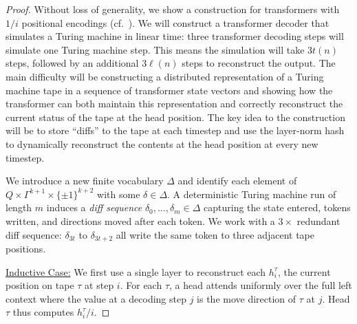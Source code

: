 \begin{proof}
    Without loss of generality, we show a construction for transformers with $1/i$ positional encodings (cf.~).
    We will construct a transformer decoder that simulates a Turing machine in linear time: three transformer decoding steps will simulate one Turing machine step. This means the simulation will take $3t(n)$ steps, followed by an additional $3\ell(n)$ steps to reconstruct the output. The main difficulty will be constructing a distributed representation of a Turing machine tape in a sequence of transformer state vectors and showing how the transformer can both maintain this representation and correctly reconstruct the current status of the tape at the head position. The key idea to the construction will be to store ``diffs'' to the tape at each timestep and use the layer-norm hash to dynamically reconstruct the contents at the head position at every new timestep.

    We introduce a new finite vocabulary $\Delta$ and identify each element of $Q \times \Gamma^{k+1} \times \{\pm 1 \}^{k+2}$ with some $\delta \in \Delta$. A deterministic Turing machine run of length $m$ induces a \emph{diff sequence} $\delta_0, \ldots, \delta_m \in \Delta$ capturing the state entered, tokens written, and directions moved after each token.
    We work with a $3{\times}$ redundant diff sequence: $\delta_{3t}$ to $\delta_{3t + 2}$ all write the same token to three adjacent tape positions.

    \underline{Inductive Case:}
    We first use a single layer to reconstruct each $h^\tau_i$, the current position on tape $\tau$ at step $i$. For each $\tau$, a head attends uniformly over the full left context where the value at a decoding step $j$ is the move direction of $\tau$ at $j$.
    Head $\tau$ thus computes $h^\tau_i/i$.


\end{proof}
